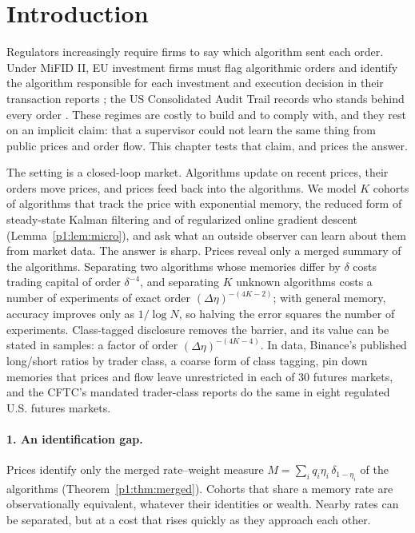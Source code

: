\section{Introduction}

Regulators increasingly require firms to say which algorithm sent each order. Under MiFID II, EU investment firms must flag algorithmic orders and identify the algorithm responsible for each investment and execution decision in their transaction reports \citep{p1:esma2016}; the US Consolidated Audit Trail records who stands behind every order \citep{p1:sec2012}. These regimes are costly to build and to comply with, and they rest on an implicit claim: that a supervisor could not learn the same thing from public prices and order flow. This chapter tests that claim, and prices the answer.

The setting is a closed-loop market. Algorithms update on recent prices, their orders move prices, and prices feed back into the algorithms. We model $K$ cohorts of algorithms that track the price with exponential memory, the reduced form of steady-state Kalman filtering and of regularized online gradient descent (Lemma~\ref{p1:lem:micro}), and ask what an outside observer can learn about them from market data. The answer is sharp. Prices reveal only a merged summary of the algorithms. Separating two algorithms whose memories differ by $\delta$ costs trading capital of order $\delta^{-4}$, and separating $K$ unknown algorithms costs a number of experiments of exact order $(\Delta\eta)^{-(4K-2)}$; with general memory, accuracy improves only as $1/\log N$, so halving the error squares the number of experiments. Class-tagged disclosure removes the barrier, and its value can be stated in samples: a factor of order $(\Delta\eta)^{-(4K-4)}$. In data, Binance's published long/short ratios by trader class, a coarse form of class tagging, pin down memories that prices and flow leave unrestricted in each of 30 futures markets, and the CFTC's mandated trader-class reports do the same in eight regulated U.S. futures markets.

\paragraph{1. An identification gap.} Prices identify only the merged rate--weight measure $M=\sum_i q_i\eta_i\,\delta_{1-\eta_i}$ of the algorithms (Theorem~\ref{p1:thm:merged}). Cohorts that share a memory rate are observationally equivalent, whatever their identities or wealth. Nearby rates can be separated, but at a cost that rises quickly as they approach each other.

